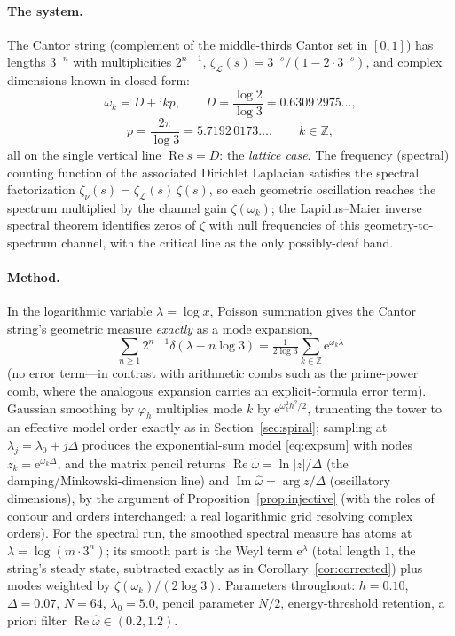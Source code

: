 \documentclass[11pt, a4paper]{article}
\theoremstyle{definition}
\theoremstyle{remark}
\newcommand{\Z}{\mathbb{Z}}
\newcommand{\ii}{\mathrm{i}}
\newcommand{\ee}{\mathrm{e}}
\begin{document}
\paragraph{The system.} The Cantor string (complement of the middle-thirds
Cantor set in $[0,1]$) has lengths $3^{-n}$ with multiplicities $2^{n-1}$,
$\zeta_{\mathcal{L}}(s)=3^{-s}/(1-2\cdot3^{-s})$, and complex dimensions
known in closed form:
\begin{equation}\label{eq:cantordims}
\omega_k = D+\ii kp, \qquad
D=\frac{\log2}{\log3}=0.6309\,2975\ldots,
\end{equation}
\begin{equation*}
p=\frac{2\pi}{\log3}=5.7192\,0173\ldots, \qquad k\in\Z,
\end{equation*}
all on the single vertical line $\operatorname{Re}s=D$: the \emph{lattice
case}. The frequency (spectral) counting function of the associated
Dirichlet Laplacian satisfies the spectral factorization
$\zeta_\nu(s)=\zeta_{\mathcal{L}}(s)\,\zeta(s)$, so each geometric
oscillation reaches the spectrum multiplied by the channel gain
$\zeta(\omega_k)$; the Lapidus--Maier inverse spectral theorem
\cite{LapidusMaier1995} identifies zeros of $\zeta$ with null frequencies
of this geometry-to-spectrum channel, with the critical line as the only
possibly-deaf band.

\paragraph{Method.} In the logarithmic variable $\lambda=\log x$, Poisson
summation gives the Cantor string's geometric measure \emph{exactly} as a
mode expansion,
\begin{equation*}
\sum_{n\ge1}2^{n-1}\delta(\lambda-n\log3)
=\tfrac{1}{2\log3}\sum_{k\in\Z}\ee^{\omega_k\lambda}
\end{equation*}
(no error term---in contrast with arithmetic combs such as the prime-power
comb, where the analogous expansion carries an explicit-formula error
term). Gaussian smoothing by
$\varphi_h$ multiplies mode $k$ by $\ee^{\omega_k^{2}h^{2}/2}$, truncating
the tower to an effective model order exactly as in
Section~\ref{sec:spiral}; sampling at $\lambda_j=\lambda_0+j\Delta$
produces the exponential-sum model \eqref{eq:expsum} with nodes
$z_k=\ee^{\omega_k\Delta}$, and the matrix pencil returns
$\operatorname{Re}\hat\omega=\ln|z|/\Delta$ (the damping/Minkowski-dimension
line) and $\operatorname{Im}\hat\omega=\arg z/\Delta$ (oscillatory
dimensions), by the argument of Proposition~\ref{prop:injective} (with the
roles of contour and orders interchanged: a real logarithmic grid
resolving complex orders). For the spectral run, the
smoothed spectral measure has atoms at $\lambda=\log(m\cdot3^{n})$; its
smooth part is the Weyl term $\ee^{\lambda}$ (total length $1$, the
string's steady state, subtracted exactly as in
Corollary~\ref{cor:corrected}) plus modes weighted by
$\zeta(\omega_k)/(2\log3)$. Parameters throughout: $h=0.10$,
$\Delta=0.07$, $N=64$, $\lambda_0=5.0$, pencil parameter $N/2$,
energy-threshold retention, a priori filter
$\operatorname{Re}\hat\omega\in(0.2,1.2)$.
\end{document}

